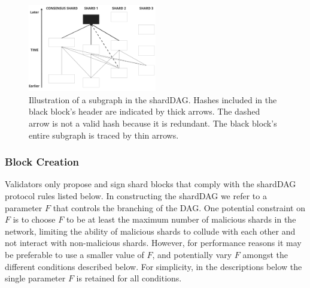 \begin{figure}
	\centering
	\includegraphics[width=0.5\textwidth]{figures/Subgraph.jpg}
	\caption{ Illustration of a subgraph in the shardDAG. 
		Hashes included in the black block's header are indicated by thick arrows. 
		The dashed arrow is not a valid hash because it is redundant. 
		The black block's entire subgraph is traced by thin arrows.}
	\label{figure:shard-formation}
\end{figure}




\subsubsection{Block Creation}

Validators only propose and sign shard blocks that comply with the shardDAG protocol rules listed below. 
In constructing the shardDAG we refer to a parameter $F$ that controls the branching of the DAG. 
One potential constraint on $F$ is to choose $F$ to be at least the maximum number of malicious shards in the network, limiting the ability of malicious shards to collude with each other and not interact with non-malicious shards. 
However, for performance reasons it may be preferable to use a smaller value of $F$, and potentially vary $F$ amongst the different conditions described below. 
For simplicity, in the descriptions below the single parameter $F$ is retained for all conditions.

